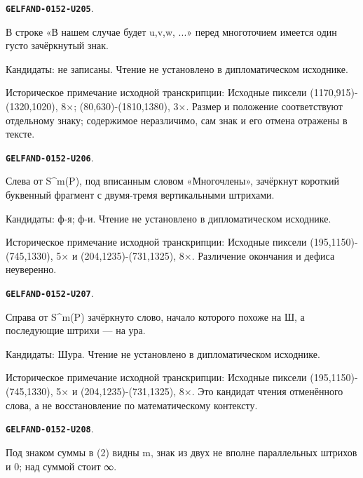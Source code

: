 \documentclass[11pt]{article}
\theoremstyle{definition}
\theoremstyle{remark}
\begin{document}
\par\noindent\leavevmode{}\label{GELFAND-0152-U205}\label{GELFAND-P001399:cancelled-after-w:note}\textbf{\texttt{GELFAND-0152-U205}}.\nopagebreak[4]\par
В строке «В нашем случае будет u,v,w, ...» перед многоточием имеется один густо зачёркнутый знак.\par
Кандидаты: не записаны. Чтение не установлено в дипломатическом исходнике.\par
Историческое примечание исходной транскрипции: Исходные пиксели (1170,915)-(1320,1020), 8×; (80,630)-(1810,1380), 3×. Размер и положение соответствуют отдельному знаку; содержимое неразличимо, сам знак и его отмена отражены в тексте.\par\medskip
\par\noindent\leavevmode{}\label{GELFAND-0152-U206}\label{GELFAND-P001399:cancelled-before-sm:note}\textbf{\texttt{GELFAND-0152-U206}}.\nopagebreak[4]\par
Слева от S\textasciicircum{}m(P), под вписанным словом «Многочлены», зачёркнут короткий буквенный фрагмент с двумя-тремя вертикальными штрихами.\par
Кандидаты: ф-я; ф-и. Чтение не установлено в дипломатическом исходнике.\par
Историческое примечание исходной транскрипции: Исходные пиксели (195,1150)-(745,1330), 5× и (204,1235)-(731,1325), 8×. Различение окончания и дефиса неуверенно.\par\medskip
\par\noindent\leavevmode{}\label{GELFAND-0152-U207}\label{GELFAND-P001399:cancelled-after-sm:note}\textbf{\texttt{GELFAND-0152-U207}}.\nopagebreak[4]\par
Справа от S\textasciicircum{}m(P) зачёркнуто слово, начало которого похоже на Ш, а последующие штрихи — на ура.\par
Кандидаты: Шура. Чтение не установлено в дипломатическом исходнике.\par
Историческое примечание исходной транскрипции: Исходные пиксели (195,1150)-(745,1330), 5× и (204,1235)-(731,1325), 8×. Это кандидат чтения отменённого слова, а не восстановление по математическому контексту.\par\medskip
\par\noindent\leavevmode{}\label{GELFAND-0152-U208}\label{GELFAND-P001399:equation-2-lower-bound:note}\textbf{\texttt{GELFAND-0152-U208}}.\nopagebreak[4]\par
Под знаком суммы в (2) видны m, знак из двух не вполне параллельных штрихов и 0; над суммой стоит ∞.\par
\end{document}
